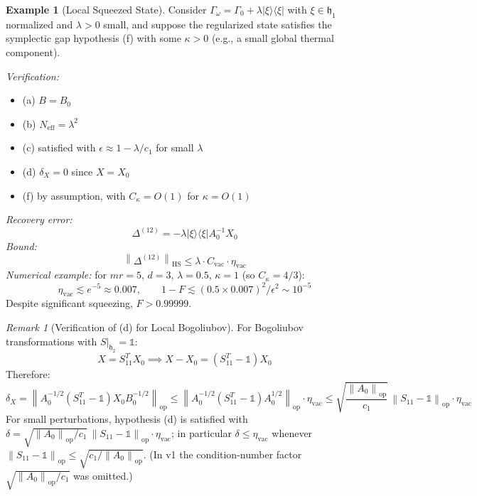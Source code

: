 \documentclass[11pt,a4paper]{article}
\newcommand{\idm}{\mathds{1}}}{\newcommand{\idm}{\mathbf{1}}}
\theoremstyle{plain}
\theoremstyle{definition}
\newtheorem{example}[theorem]{Example}
\theoremstyle{remark}
\newtheorem{remark}[theorem]{Remark}
\newcommand{\hh}{\mathfrak{h}}
\newcommand{\opnorm}[1]{\left\lVert #1 \right\rVert_{\mathrm{op}}}
\newcommand{\hsnorm}[1]{\left\lVert #1 \right\rVert_{\mathrm{HS}}}
\newcommand{\etavac}{\eta_{\mathrm{vac}}}
\newcommand{\Cvac}{C_{\mathrm{vac}}}
\newcommand{\Neff}{N_{\mathrm{eff}}}
\newcommand{\Ckappa}{C_{\kappa}}
\begin{document}
\begin{example}[Local Squeezed State]\label{ex:squeezed}
Consider $\Gamma_\omega = \Gamma_0 + \lambda|\xi\rangle\langle\xi|$ with
$\xi \in \hh_1$ normalized and $\lambda > 0$ small, and suppose the regularized
state satisfies the symplectic gap hypothesis (f) with some $\kappa > 0$ (e.g.,
a small global thermal component).

\emph{Verification:}
\begin{itemize}
\item (a) $B = B_0$ \checkmark
\item (b) $\Neff = \lambda^2$ \checkmark
\item (c) satisfied with $\epsilon \approx 1 - \lambda/c_1$ for small $\lambda$
\checkmark
\item (d) $\delta_X = 0$ since $X = X_0$ \checkmark
\item (f) by assumption, with $\Ckappa = O(1)$ for $\kappa = O(1)$ \checkmark
\end{itemize}
\emph{Recovery error:}
\begin{equation}
\Delta^{(12)} = -\lambda|\xi\rangle\langle\xi| A_0^{-1} X_0
\end{equation}
\emph{Bound:}
\begin{equation}
\hsnorm{\Delta^{(12)}} \le \lambda \cdot \Cvac \cdot \etavac
\end{equation}
\emph{Numerical example:} for $mr = 5$, $d = 3$, $\lambda = 0.5$, $\kappa = 1$
(so $\Ckappa = 4/3$):
\begin{equation}
\etavac \lesssim e^{-5} \approx 0.007, \qquad
1 - F \lesssim (0.5 \times 0.007)^2/\epsilon^2 \sim 10^{-5}
\end{equation}
Despite significant squeezing, $F > 0.99999$.
\end{example}

\begin{remark}[Verification of (d) for Local Bogoliubov]\label{rem:bogoliubov}
For Bogoliubov transformations with $S|_{\hh_2} = \idm$:
\begin{equation}
X = S_{11}^T X_0 \implies X - X_0 = (S_{11}^T - \idm)X_0
\end{equation}
Therefore:
\begin{equation}
\delta_X = \opnorm{A_0^{-1/2}(S_{11}^T - \idm)X_0 B_0^{-1/2}}
\le \opnorm{A_0^{-1/2}(S_{11}^T - \idm)A_0^{1/2}} \cdot \etavac
\le \sqrt{\frac{\opnorm{A_0}}{c_1}}\, \opnorm{S_{11} - \idm} \cdot \etavac
\end{equation}
For small perturbations, hypothesis (d) is satisfied with
$\delta = \sqrt{\opnorm{A_0}/c_1}\,\opnorm{S_{11} - \idm}\cdot\etavac$; in
particular $\delta \le \etavac$ whenever
$\opnorm{S_{11} - \idm} \le \sqrt{c_1/\opnorm{A_0}}$. (In v1 the
condition-number factor $\sqrt{\opnorm{A_0}/c_1}$ was omitted.)
\end{remark}
\end{document}
